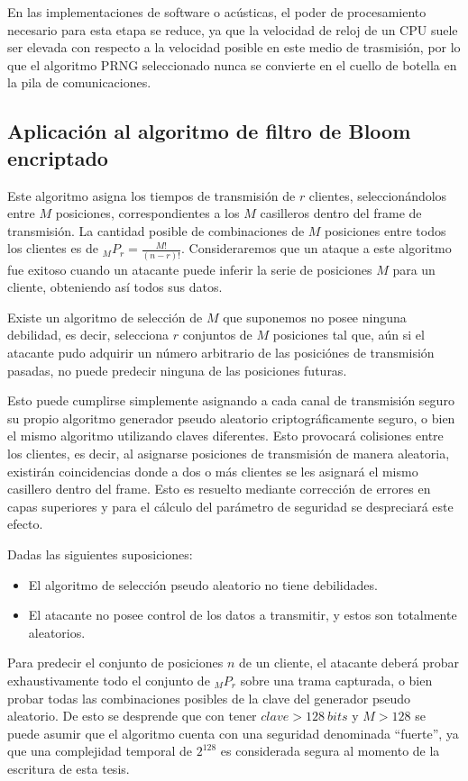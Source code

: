 En las implementaciones de software o acústicas, el poder de procesamiento necesario para esta etapa se reduce, ya que la velocidad de reloj de un CPU suele ser elevada con respecto a la velocidad posible en este medio de trasmisión, por lo que el algoritmo PRNG seleccionado nunca se convierte en el cuello de botella en la pila de comunicaciones.


\subsection{Aplicación al algoritmo de filtro de Bloom encriptado}

Este algoritmo asigna los tiempos de transmisión de $r$ clientes, seleccionándolos entre $M$ posiciones, correspondientes a los $M$ casilleros dentro del frame de transmisión.
La cantidad posible de combinaciones de $M$ posiciones entre todos los clientes es de $ _{M}P_{r} = \frac{M!}{(n-r)!} $.
Consideraremos que un ataque a este algoritmo fue exitoso cuando un atacante puede inferir la serie de posiciones $M$ para un cliente, obteniendo así todos sus datos.

Existe un algoritmo de selección de $M$ que suponemos no posee ninguna debilidad, es decir, selecciona $r$ conjuntos de $M$ posiciones tal que, aún si el atacante pudo adquirir un número arbitrario de las posiciónes de transmisión pasadas, no puede predecir ninguna de las posiciones futuras.

Esto puede cumplirse simplemente asignando a cada canal de transmisión seguro su propio algoritmo generador pseudo aleatorio criptográficamente seguro, o bien el mismo algoritmo utilizando claves diferentes. Esto provocará colisiones entre los clientes, es decir, al asignarse posiciones de transmisión de manera aleatoria, existirán coincidencias donde a dos o más clientes se les asignará el mismo casillero dentro del frame. Esto es resuelto mediante corrección de errores en capas superiores y para el cálculo del parámetro de seguridad se despreciará este efecto.

Dadas las siguientes suposiciones:
\begin{itemize}
 \item El algoritmo de selección pseudo aleatorio no tiene debilidades.
 \item El atacante no posee control de los datos a transmitir, y estos son totalmente aleatorios.
\end{itemize}

Para predecir el conjunto de posiciones $n$ de un cliente, el atacante deberá probar exhaustivamente todo el conjunto de $ _{M}P_{r}$ sobre una trama capturada, o bien probar todas las combinaciones posibles de la clave del generador pseudo aleatorio. De esto se desprende que con tener $clave>128\ bits$ y $M>128$ se puede asumir que el algoritmo cuenta con una seguridad denominada ``fuerte'', ya que una complejidad temporal de $2 ^{128}$ es considerada segura al momento de la escritura de esta tesis.

